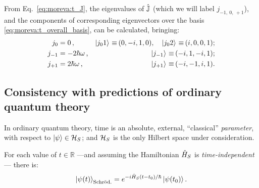 From Eq.~\eqref{eq:moreva:t_J},
the eigenvalues of $\hat{\mathbb{J}}$
(which we will label $j_{-1, \: 0, \: +1}$),
and the components of corresponding eigenvectors over the basis \eqref{eq:moreva:t_overall_basis},
can be calculated, bringing:
\begin{align}
  j_0     &= 0\,\text{,}              &\ket{j_{0}1}   \operatorname*{\,\equiv\,} (0, -i, 1, 0) \text{,}\quad \ket{j_0 2} \operatorname*{\,\equiv\,} (i, 0, 0 ,1) \text{;}
    \label{eq:moreva:eigenJ0} \\
  j_{-1}  &= -2\hbar\omega\,\text{,}  &\ket{j_{-1}}   \operatorname*{\,\equiv\,} (-i, 1, -i, 1) \text{;} \\
  j_{+1}   &= 2\hbar\omega\,\text{,}  &\ket{j_{+1}}   \operatorname*{\,\equiv\,} (-i, -1, i, 1) \text{.}
\end{align}



\subsection{Consistency with predictions of ordinary quantum theory}
\label{sec:qubit:pw-vs-qm}

In ordinary quantum theory, time is an absolute, external, ``classical'' \emph{parameter},
with respect to $\ket{\psi} \in \mathcal{H}_S$; and $\mathcal{H}_S$
is the only Hilbert space under consideration.

For each value of $t \in \mathbb{R}$
---and assuming the Hamiltonian $\hat{H}_{S}$ is \emph{time-in\-de\-pend\-ent}---
there is:
\begin{equation}\label{eq:ordinary_evolution}
  \ket{\psi(t)}_{\text{Schr\"od.}} =
  e^{-i\hat{H}_{S}(t-t_0)/\hbar}\ket{\psi(t_0)}
  \text{.}
\end{equation}

